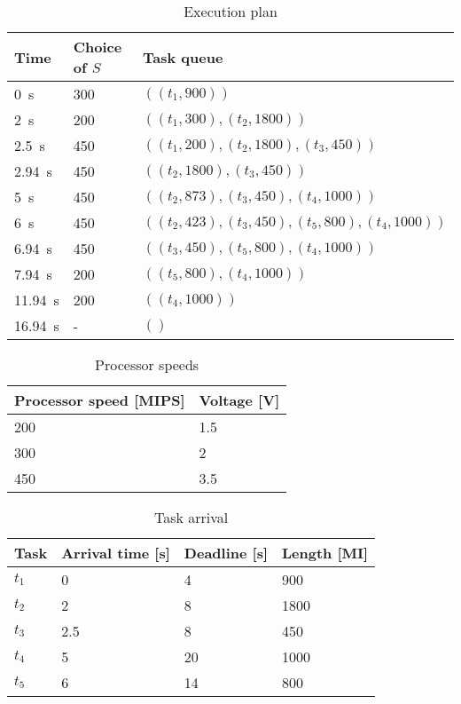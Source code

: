 \documentclass[a4paper]{scrreprt}
\begin{document}
\begin{table}
		\centering
		\begin{tabular}{lll}
				\toprule
				Time & Choice of $S$ & Task queue \\
				\midrule
				\SI{0}{\s} & 300 & $((t_1, 900))$ \\
				\SI{2}{\s} & 200 & $((t_1, 300), (t_2, 1800))$ \\
				\SI{2.5}{\s} & 450 & $((t_1, 200), (t_2, 1800), (t_3, 450))$ \\
				\SI{2.94}{\s} & 450 & $((t_2, 1800), (t_3, 450))$ \\
				\SI{5}{\s} & 450 & $((t_2, 873), (t_3, 450), (t_4, 1000))$ \\
				\SI{6}{\s} & 450 & $((t_2, 423), (t_3, 450), (t_5, 800), (t_4, 1000))$ \\
				\SI{6.94}{\s} & 450 & $((t_3, 450), (t_5, 800), (t_4, 1000))$ \\
				\SI{7.94}{\s} & 200 & $((t_5, 800), (t_4, 1000))$ \\
				\SI{11.94}{\s} & 200 & $((t_4, 1000))$ \\
				\SI{16.94}{\s} & - & $()$ \\
				\bottomrule
		\end{tabular}
		\caption{Execution plan}
		\label{tbl:execution_plan}
\end{table}

\begin{table}
		\centering
		\begin{tabular}{ll}
				\toprule
				Processor speed [MIPS] & Voltage [V] \\
				\midrule
				200 & 1.5 \\
				300 & 2 \\
				450 & 3.5 \\
				\bottomrule
		\end{tabular}
		\caption{Processor speeds}
		\label{tbl:processor_speeds}
\end{table}

\begin{table}
		\centering
		\begin{tabular}{llll}
				\toprule
				Task & Arrival time [s] & Deadline [s] & Length [MI] \\
				\midrule
				$t_1$ & 0 & 4 & 900 \\
				$t_2$ & 2 & 8 & 1800 \\
				$t_3$ & 2.5 & 8 & 450 \\
				$t_4$ & 5 & 20 & 1000 \\
				$t_5$ & 6 & 14 & 800 \\
				\bottomrule
		\end{tabular}
		\caption{Task arrival}
		\label{tbl:tasks}
\end{table}
\end{document}
